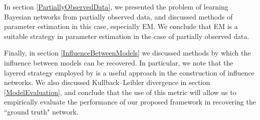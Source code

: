 \documentclass [11pt]{article}
\begin{document}
In section \ref{PartiallyObservedData}, we presented the problem of learning Bayesian networks from partially observed data, and discussed methods of parameter estimation in this case, especially EM. We conclude that EM is a suitable strategy in parameter estimation in the case of partially observed data.

Finally, in section \ref{InfluenceBetweenModels} we discussed methods by which the influence between models can be recovered. In particular, we note that the layered strategy employed by \cite{ajoodha17} is a useful approach in the construction of influence networks. We also discussed Kullback–Leibler divergence in section \ref{ModelEvaluation}, and conclude that the use of this metric will allow us to empirically evaluate the performance of our proposed framework in recovering the ``ground truth" network.


\end{document}
